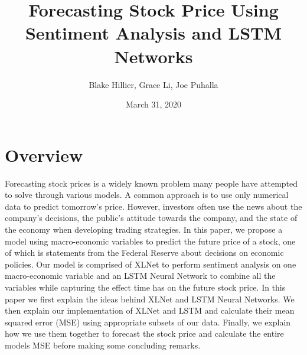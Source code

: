 \documentclass{article}
\title{Forecasting Stock Price Using Sentiment Analysis and LSTM Networks}
\author{Blake Hillier, Grace Li, Joe Puhalla}
\date{March 31, 2020}
\begin{document}
\maketitle

\section{Overview}
Forecasting stock prices is a widely known problem many people have attempted to solve through various models. A common approach is to use only numerical data to predict tomorrow's price. However, investors often use the news about the company's decisions, the public's attitude towards the company, and the state of the economy when developing trading strategies. In this paper, we propose a model using macro-economic variables to predict the future price of a stock, one of which is statements from the Federal Reserve about decisions on economic policies. Our model is comprised of XLNet to perform sentiment analysis on one macro-economic variable and an LSTM Neural Network to combine all the variables while capturing the effect time has on the future stock price. In this paper we first explain the ideas behind XLNet and LSTM Neural Networks. We then explain our implementation of XLNet and LSTM and calculate their mean squared error (MSE) using appropriate subsets of our data. Finally, we explain how we use them together to forecast the stock price and calculate the entire models MSE before making some concluding remarks.
\end{document}
